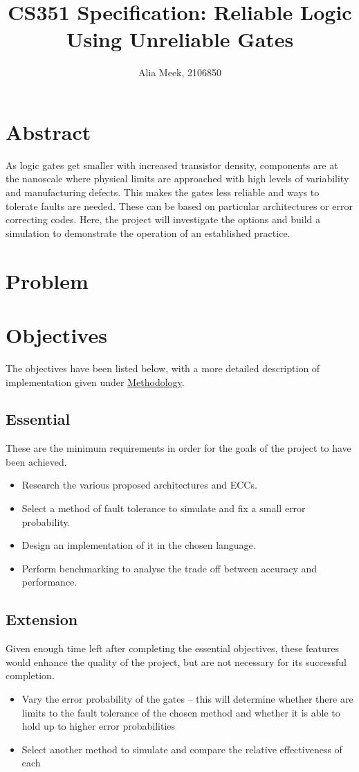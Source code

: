 \documentclass[12pt,a4paper]{article}
\title{CS351 Specification: Reliable Logic Using Unreliable Gates}
\author{Alia Meek, 2106850}
\date{}
\begin{document}
\maketitle

\section{Abstract}
As logic gates get smaller with increased transistor density, components are at the nanoscale where physical limits 
are approached with high levels of variability and manufacturing defects. This makes the gates less reliable and 
ways to tolerate faults are needed. These can be based on particular architectures or error correcting codes. Here, 
the project will investigate the options and build a simulation to demonstrate the operation of an established 
practice.

\section{Problem}



\section{Objectives}
The objectives have been listed below, with a more detailed description of implementation given under 
\hyperref[sec:meth]{Methodology}.

\subsection{Essential}
These are the minimum requirements in order for the goals of the project to have been achieved.
\begin{itemize}
    \item Research the various proposed architectures and ECCs.
    \item Select a method of fault tolerance to simulate and fix a small error probability.
    \item Design an implementation of it in the chosen language.
    \item Perform benchmarking to analyse the trade off between accuracy and performance.
\end{itemize}

\subsection{Extension}
Given enough time left after completing the essential objectives, these features would enhance the quality of the 
project, but are not necessary for its successful completion.
\begin{itemize}
    \item Vary the error probability of the gates -- this will determine whether there are limits to the fault 
    tolerance of the chosen method and whether it is able to hold up to higher error probabilities
    \item Select another method to simulate and compare the relative effectiveness of each
\end{itemize}
\end{document}
